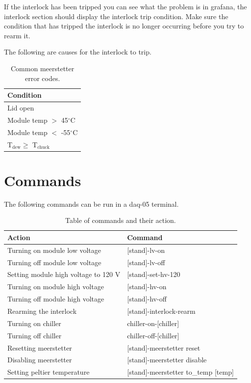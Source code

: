 \documentclass[12pt]{article}
\begin{document}
If the interlock has been tripped you can see what the problem is in grafana, the interlock section should display the interlock trip condition. Make sure the condition that has tripped the interlock is no longer occurring before you try to rearm it. 

The following are causes for the interlock to trip.
\begin{table}[H]
    \centering
    \begin{tabular}{l}
        \hline 
        Condition\\
        \hline
        \hline
        Lid open\\
        Module temp $>$ 45$^\circ$C\\
        Module temp $<$ -55$^\circ$C\\
        T$_\text{dew} \geq$ T$_\text{chuck}$\\
        \hline
    \end{tabular}
    \caption{Common meerstetter error codes.}
    \label{tab:meer}
\end{table}

\section{Commands}
The following commands can be run in a daq-05 terminal. 
\begin{table}[H]
    \centering
    \begin{tabular}{l|l}
        \hline 
        Action & Command \\
        \hline
        \hline
        Turning on module low voltage & [stand]-lv-on\\
        Turning off module low voltage & [stand]-lv-off\\
        Setting module high voltage to 120 V & [stand]-set-hv-120\\
        Turning on module high voltage & [stand]-hv-on\\
        Turning off module high voltage & [stand]-hv-off\\
        Rearming the interlock & [stand]-interlock-rearm\\
        Turning on chiller & chiller-on-[chiller]\\
        Turning off chiller & chiller-off-[chiller]\\
        Resetting meerstetter & [stand]-meerstetter reset\\
        Disabling meerstetter & [stand]-meerstetter disable\\
        Setting peltier temperature & [stand]-meerstetter to\_temp [temp]\\
        \hline
    \end{tabular}
    \caption{Table of commands and their action.}
    \label{tab:commands}
\end{table}
\end{document}
